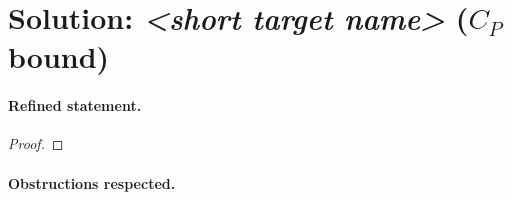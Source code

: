 \documentclass[../main.tex]{subfiles}
\begin{document}

\section*{Solution: \textit{<short target name>} (\texorpdfstring{$C_P$}{C\_P} bound)}
\label{sec:sol-<id>}

\paragraph{Refined statement.}

\begin{theorem}
\label{thm:sol-<id>}
\end{theorem}

\begin{proof}
\end{proof}

\paragraph{Obstructions respected.}

\end{document}
